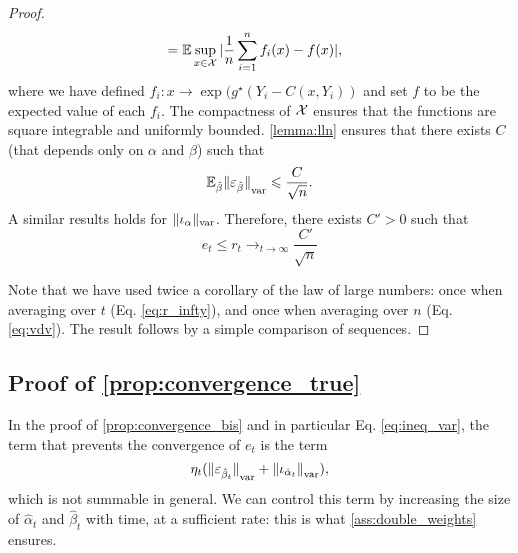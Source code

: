 \begin{proof}
\begin{align}
      &= \mathbb{E} \sup_{x \in \mathcal{X}} | \frac{1}{n} \sum_{i=1}^n f_i(x) - f(x) | ,
\end{align}
where we have defined $f_i: x \to \exp(g^\star(Y_i - C(x, Y_i))$ and set $f$ to be the
expected value of each $f_i$. The compactness of $\mathcal{X}$ ensures that the
functions  are square integrable and uniformly bounded. \autoref{lemma:lln} ensures that there exists $C$ (that depends only on $\alpha$ and $\beta$) such that
\begin{equation}\label{eq:vdv}
    \mathbb{E}_{\hat \beta} {\Vert \varepsilon_{\hat \beta} \Vert}_{\text{\upshape var}}  \leqslant \frac{C}{\sqrt{n}}.
\end{equation}
A similar results holds for $\Vert \iota_\alpha \Vert_{\text{\upshape var}}$. Therefore, there exists $C' > 0$ such that
\begin{equation}
    e_t \leq r_t \to_{t\to \infty} \frac{C'}{\sqrt{n}}
\end{equation}

Note that we have used twice a corollary of the law of large numbers: once when averaging over $t$ (Eq. \eqref{eq:r_infty}), and once when averaging over $n$ (Eq. \eqref{eq:vdv}).
The result follows by a simple comparison of sequences.
\end{proof}

\subsection{Proof of \autoref{prop:convergence_true}}

In the proof of \autoref{prop:convergence_bis} and in particular Eq. \eqref{eq:ineq_var}, the term that prevents the convergence of $e_t$ is the term
\begin{equation}
    \eta_t ({\Vert \varepsilon_{\hat \beta_t} \Vert}_{\text{\upshape var}} + 
    {\Vert \iota_{\hat \alpha_t} \Vert}_{\text{\upshape var}}),
\end{equation}
which is not summable in general. We can control this term by increasing the
 size of $\hat \alpha_t$ and $\hat \beta_t$ with time, at a sufficient rate: this is what \autoref{ass:double_weights} ensures.

